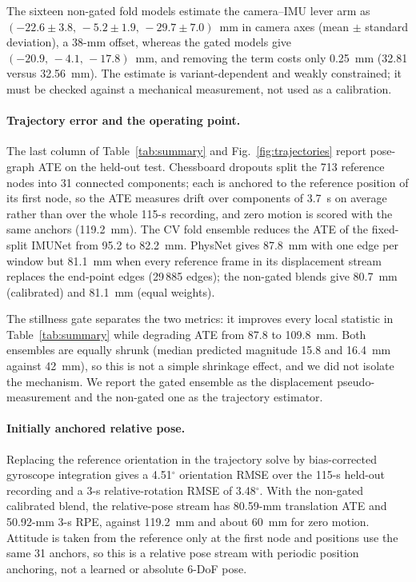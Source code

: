 The sixteen non-gated fold models estimate the camera--IMU lever arm as
$(-22.6\pm3.8,\,-5.2\pm1.9,\,-29.7\pm7.0)$~mm in camera axes (mean $\pm$
standard deviation), a 38-mm offset, whereas the gated models give
$(-20.9,\,-4.1,\,-17.8)$~mm, and removing the term costs only 0.25~mm (32.81
versus 32.56~mm). The estimate is variant-dependent and weakly constrained; it
must be checked against a mechanical measurement, not used as a calibration.

\paragraph{Trajectory error and the operating point.}
The last column of Table~\ref{tab:summary} and Fig.~\ref{fig:trajectories}
report pose-graph ATE on the held-out test. Chessboard dropouts split the
713 reference nodes into 31 connected components; each is anchored to the
reference position of its first node, so the ATE measures drift over
components of 3.7~s on average rather than over the whole 115-s recording,
and zero motion is scored with the same anchors (119.2~mm). The CV fold
ensemble reduces the ATE of the fixed-split IMUNet from 95.2 to 82.2~mm.
PhysNet gives 87.8~mm with one edge per window but 81.1~mm when every
reference frame in its displacement stream replaces the end-point edges
(29\,885 edges); the non-gated blends give 80.7~mm (calibrated) and 81.1~mm
(equal weights).

The stillness gate separates the two metrics: it improves every local
statistic in Table~\ref{tab:summary} while degrading ATE from 87.8 to 109.8~mm.
Both ensembles are equally shrunk (median predicted magnitude 15.8 and 16.4~mm
against 42~mm), so this is not a simple shrinkage effect, and we did not
isolate the mechanism. We report the gated ensemble as the displacement
pseudo-measurement and the non-gated one as the trajectory estimator.

\paragraph{Initially anchored relative pose.}
Replacing the reference orientation in the trajectory solve by bias-corrected
gyroscope integration gives a 4.51$^\circ$ orientation RMSE over the 115-s
held-out recording and a 3-s relative-rotation RMSE of 3.48$^\circ$. With the
non-gated calibrated blend, the relative-pose stream has 80.59-mm translation
ATE and 50.92-mm 3-s RPE, against 119.2~mm and about 60~mm for zero motion.
Attitude is taken from the reference only at the first node and positions use
the same 31 anchors, so this is a relative pose stream with periodic position
anchoring, not a learned or absolute 6-DoF pose.


